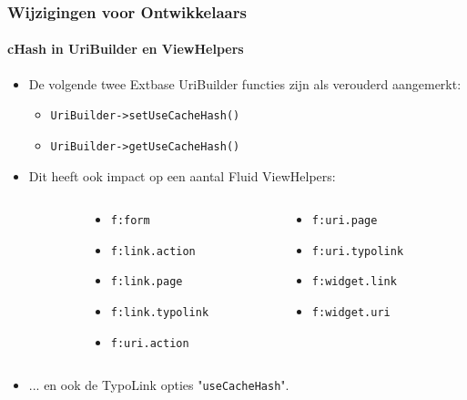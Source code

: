 \begin{frame}[fragile]
	\frametitle{Wijzigingen voor Ontwikkelaars}
	\framesubtitle{cHash in UriBuilder en ViewHelpers}

	\lstset{basicstyle=\smaller\ttfamily}

	\begin{itemize}
		\item De volgende twee Extbase UriBuilder functies zijn als verouderd aangemerkt:

			\begin{itemize}
				\item \texttt{UriBuilder->setUseCacheHash()}
				\item \texttt{UriBuilder->getUseCacheHash()}
			\end{itemize}

		\item Dit heeft ook impact op een aantal Fluid ViewHelpers:
	\end{itemize}
	\vspace{-0.4cm}
	\begin{columns}[T]
		\begin{column}{.05\textwidth}
		\end{column}
		\begin{column}{.45\textwidth}
			\begin{itemize}\smaller
				\item \texttt{f:form}
				\item \texttt{f:link.action}
				\item \texttt{f:link.page}
				\item \texttt{f:link.typolink}
				\item \texttt{f:uri.action}
			\end{itemize}\normalsize
		\end{column}
		\begin{column}{.45\textwidth}
			\begin{itemize}\smaller
				\item \texttt{f:uri.page}
				\item \texttt{f:uri.typolink}
				\item \texttt{f:widget.link}
				\item \texttt{f:widget.uri}
			\end{itemize}\normalsize
		\end{column}
	\end{columns}
	\vspace{0.2cm}
	\begin{itemize}
		\item ... en ook de TypoLink opties "\texttt{useCacheHash}".
	\end{itemize}

\end{frame}

